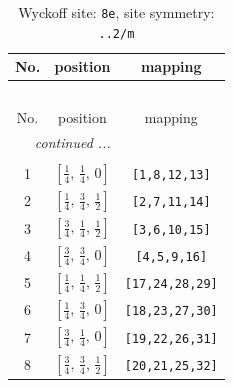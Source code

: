 \documentclass[fleqn,8pt]{jsarticle}
\begin{document}
\renewcommand{\arraystretch}{1.2}
\begin{longtable}{ccc}
\caption{Wyckoff site: {\tt 8e}, site symmetry: {\tt ..2/m}}
 \\
 \hline \hline
No. & position & mapping \\ \hline \endfirsthead

\multicolumn{2}{l}{\tablename\ \thetable{}} \\
 \hline \hline
No. & position & mapping \\ \hline \endhead

 \hline \hline
\multicolumn{2}{r}{\footnotesize\it continued ...} \\ \endfoot

 \hline \hline
\multicolumn{2}{r}{} \\ \endlastfoot

1 & $\left[ \frac{1}{4},\, \frac{1}{4},\, 0 \right]$ & {\tt [1,8,12,13]} \\ \hline
2 & $\left[ \frac{1}{4},\, \frac{3}{4},\, \frac{1}{2} \right]$ & {\tt [2,7,11,14]} \\ \hline
3 & $\left[ \frac{3}{4},\, \frac{1}{4},\, \frac{1}{2} \right]$ & {\tt [3,6,10,15]} \\ \hline
4 & $\left[ \frac{3}{4},\, \frac{3}{4},\, 0 \right]$ & {\tt [4,5,9,16]} \\ \hline
5 & $\left[ \frac{1}{4},\, \frac{1}{4},\, \frac{1}{2} \right]$ & {\tt [17,24,28,29]} \\ \hline
6 & $\left[ \frac{1}{4},\, \frac{3}{4},\, 0 \right]$ & {\tt [18,23,27,30]} \\ \hline
7 & $\left[ \frac{3}{4},\, \frac{1}{4},\, 0 \right]$ & {\tt [19,22,26,31]} \\ \hline
8 & $\left[ \frac{3}{4},\, \frac{3}{4},\, \frac{1}{2} \right]$ & {\tt [20,21,25,32]} \\
\end{longtable}
\renewcommand{\arraystretch}{1.2}
\end{document}
